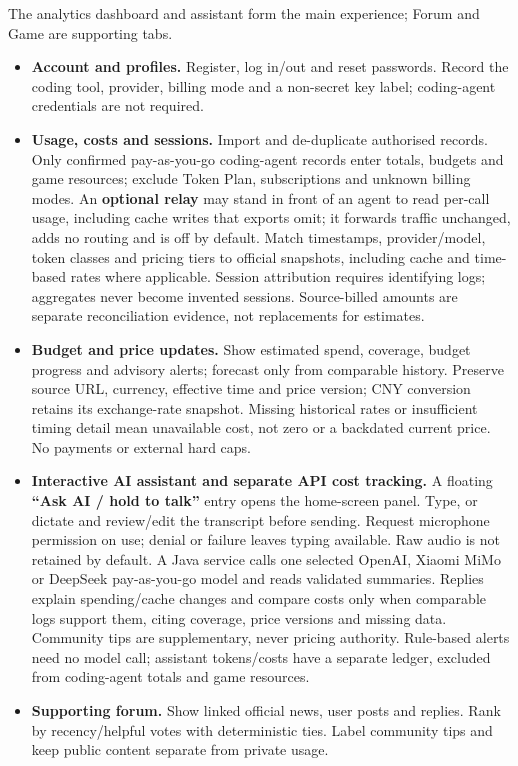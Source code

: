 \documentclass[11pt,a4paper]{article}
\newcommand{\sect}[1]{\vspace{3pt}{\large\bfseries#1}\par\vspace{1pt}}
\newcommand{\smallhead}[1]{{\bfseries#1}}
\begin{document}
\sect{5. Core features and implementation approach}
The analytics dashboard and assistant form the main experience; Forum and Game are supporting tabs.
\begin{itemize}
  \item \smallhead{Account and profiles.} Register, log in/out and reset passwords. Record the coding tool, provider, billing mode and a non-secret key label; coding-agent credentials are not required.
  \item \smallhead{Usage, costs and sessions.} Import and de-duplicate authorised records. Only confirmed pay-as-you-go coding-agent records enter totals, budgets and game resources; exclude Token Plan, subscriptions and unknown billing modes. An \textbf{optional relay} may stand in front of an agent to read per-call usage, including cache writes that exports omit; it forwards traffic unchanged, adds no routing and is off by default. Match timestamps, provider/model, token classes and pricing tiers to official snapshots, including cache and time-based rates where applicable. Session attribution requires identifying logs; aggregates never become invented sessions. Source-billed amounts are separate reconciliation evidence, not replacements for estimates.
  \item \smallhead{Budget and price updates.} Show estimated spend, coverage, budget progress and advisory alerts; forecast only from comparable history. Preserve source URL, currency, effective time and price version; CNY conversion retains its exchange-rate snapshot. Missing historical rates or insufficient timing detail mean unavailable cost, not zero or a backdated current price. No payments or external hard caps.
  \item \smallhead{Interactive AI assistant and separate API cost tracking.} A floating \textbf{``Ask AI / hold to talk''} entry opens the home-screen panel. Type, or dictate and review/edit the transcript before sending. Request microphone permission on use; denial or failure leaves typing available. Raw audio is not retained by default. A Java service calls one selected OpenAI, Xiaomi MiMo or DeepSeek pay-as-you-go model and reads validated summaries. Replies explain spending/cache changes and compare costs only when comparable logs support them, citing coverage, price versions and missing data. Community tips are supplementary, never pricing authority. Rule-based alerts need no model call; assistant tokens/costs have a separate ledger, excluded from coding-agent totals and game resources.
  \item \smallhead{Supporting forum.} Show linked official news, user posts and replies. Rank by recency/helpful votes with deterministic ties. Label community tips and keep public content separate from private usage.

\end{itemize}
\end{document}
